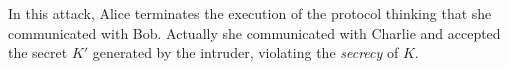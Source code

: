 \documentclass[10pt,a4paper]{article}
\begin{document}
In this attack, Alice terminates the execution of the protocol thinking that she communicated with Bob. Actually she communicated with Charlie and accepted the secret \(K'\) generated by the intruder, violating the {\em secrecy} of \(K\).

\end{document}
